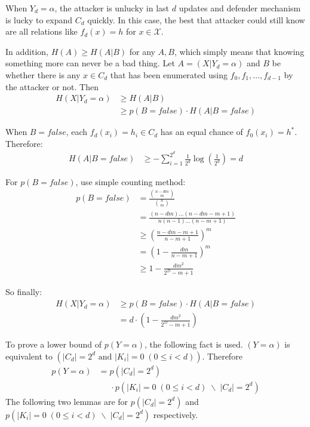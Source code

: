 \documentclass[10pt, conference, compsocconf]{IEEEtran}
\begin{document}
		\begin{IEEEproof}
			When $Y_d = \alpha$, the attacker
			is unlucky in last $d$ updates
			and defender mechanism is lucky
			to expand $C_d$ quickly.
			In this case, the best that attacker
			could still know are all relations
			like $f_d(x) = h$ for $x \in \mathcal X$.
			
			In addition, $H(A) \geq H(A|B)$ for
			any $A, B$, which simply means that knowing something
			more can never be a bad thing. Let $A = (X | Y_d = \alpha)$
			and $B$ be whether there is any $x \in C_d$ that
			has been enumerated using $f_0, f_1, \ldots, f_{d-1}$ 
			by the attacker or not.
			Then
			\begin{align*}
				H(X | Y_d = \alpha) %
					&\geq H(A | B)\\
					&\geq p(B = false) \cdot H(A | B = false)
			\end{align*}
			
			When $B = false$, each $f_d(x_i) = h_i \in C_d$
			has an equal chance of $f_0(x_i) = h^*$. Therefore:
			\begin{align*}
				H(A | B = false) &\geq -\sum_{i = 1}^{2^d} \frac{1}{2^d} \log(\frac{1}{2^d})
					= d
			\end{align*}
			
			For $p(B = false)$, use simple counting method:
			\begin{align*}
				p(B = false) &= \frac{\binom{n-dm}{m}}{\binom{n}{m}}\\
					&= \frac{(n-dm)\ldots(n-dm-m+1)}{n(n-1)\ldots(n-m+1)}\\
					&\geq (\frac{n-dm-m+1}{n-m+1})^m\\
					&= (1-\frac{dm}{n-m+1})^m\\
					&\geq 1-\frac{dm^2}{2^D-m+1}
			\end{align*}
			
			So finally:
			\begin{align*}
				H(X | Y_d = \alpha) &\geq p(B = false) \cdot H(A | B = false)\\
					&= d \cdot (1-\frac{dm^2}{2^D-m+1})
			\end{align*}
		\end{IEEEproof}
		
		To prove a lower bound of $p(Y = \alpha)$, the following fact is used.
		$(Y = \alpha)$ is equivalent to $\left(|C_d| = 2^d \text{ and } |K_i| = 0	\; (0 \leq i < d)\right)$.
		Therefore 
		\begin{align*}
			p(Y = \alpha) &= p(|C_d| = 2^d)\\
				& \;\;\;\;\; \cdot p(|K_i| = 0	\; (0 \leq i < d) \; \backslash \; |C_d| = 2^d)
		\end{align*}
		The following two lemmas are for $p(|C_d| = 2^d)$ and $p(|K_i| = 0	\; (0 \leq i < d) \; \backslash \; |C_d| = 2^d)$ 
		respectively.
		
\end{document}

